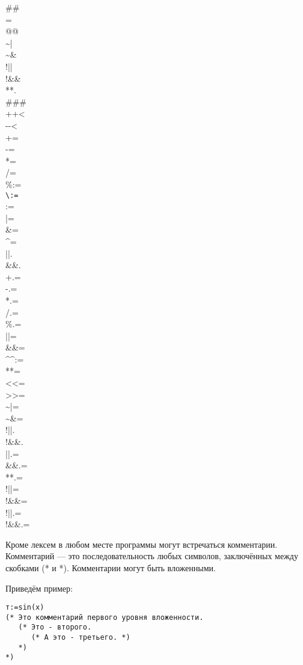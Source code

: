 \documentclass[10pt]{report}
\begin{document}
\begin{center}
\begin{multicols}{10}
\#\#\\
=\\
@@\\
\~{ }|\\
\~{ }\&\\
!||\\
!\&\&\\
**.\\
\#\#\#\\
+{}+<\\
-{}-<\\
+=\\
-=\\
*=\\
/=\\
\%:=\\
\verb"\:="\\
:=\\
|=\\
\&=\\
\^{ }=\\
||.\\
\&\&.\\
+.=\\
-.=\\
*.=\\
/.=\\
\%.=\\
||=\\
\&\&=\\
\^{ }\^{ }:=\\
**=\\
<{}<=\\
>{}>=\\
\~{ }|=\\
\~{ }\&=\\
!||.\\
!\&\&.\\
||.=\\
\&\&.=\\
**.=\\
!||=\\
!\&\&=\\
!||.=\\
!\&\&.=%
\end{multicols}
\end{center}

Кроме лексем в любом месте программы могут встречаться комментарии. Комментарий --- это последовательность любых символов, заключённых между скобками (* и *). Комментарии
могут быть вложенными.


Приведём пример:
\begin{verbatim}
т:=sin(x)
(* Это комментарий первого уровня вложенности.
   (* Это - второго.
      (* А это - третьего. *)
   *)
*)
\end{verbatim}
\end{document}
